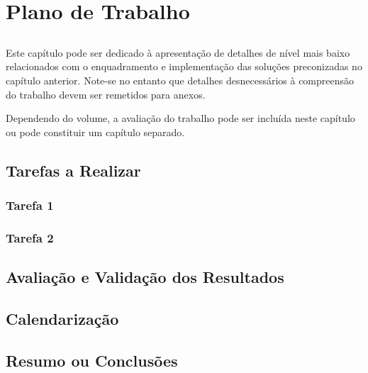 
\chapter{Plano de Trabalho}\label{chap:chap4}

\section*{}

Este capítulo pode ser dedicado à apresentação de detalhes de nível
mais baixo relacionados com o enquadramento e implementação das
soluções preconizadas no capítulo anterior.
Note-se no entanto que detalhes desnecessários à compreensão do
trabalho devem ser remetidos para anexos.

Dependendo do volume, a avaliação do trabalho pode ser incluída neste
capítulo ou pode constituir um capítulo separado.

\section{Tarefas a Realizar} %
\label{sec:tarefas}

  \subsection{Tarefa 1} %
  \label{sub:tarefa_1}
  

  \subsection{Tarefa 2} %
  \label{sub:tarefa_2}
  


\section{Avaliação e Validação dos Resultados} %
\label{sec:avaliacao}


\section{Calendarização} %
\label{sec:calendarizacao}


\section{Resumo ou Conclusões}

\lipsum[1]
